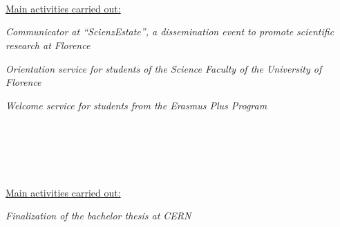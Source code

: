 \begin{cvcontent}
  \\ [0.5mm]
  \\ [1.5mm]
  \\ [1.5mm]
  {\normalsize \color{maincolor} \ul{Main activities carried out:}\\ [1.5mm]
  \begin{itemize*}[label=\textcolor{iconcolor}{\textbullet}]
    \item \emph{Communicator at ``ScienzEstate'', a dissemination 
      event to promote scientific research at Florence}\\ [0.5mm]
    \item \emph{Orientation service for students of the Science 
      Faculty of the University of Florence}\\ [0.5mm]
    \item \emph{Welcome service for students from the Erasmus 
      Plus Program}
  \end{itemize*}}
  \\ [4mm]
  \\ [0.5mm]
  \\ [1.5mm]
  \\ [1.5mm]
  {\normalsize \color{maincolor} \ul{Main activities carried out:}\\ [1.5mm]
  \begin{itemize*}[label=\textcolor{iconcolor}{\textbullet}]
    \item \emph{Finalization of the bachelor thesis at CERN}
  \end{itemize*}}
\end{cvcontent}